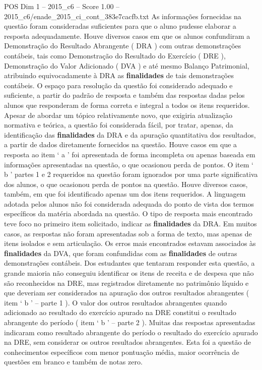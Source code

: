 \begin{textsample}{POS Dim 1 – 2015\_c6 – Score 1.00 – 2015\_c6/enade\_2015\_ci\_cont\_383e7cacfb.txt}
As informações fornecidas na questão foram consideradas suficientes para que o aluno pudesse elaborar a resposta adequadamente.
Houve diversos casos em que os alunos confundiram a Demonstração do Resultado Abrangente ( DRA ) com outras demonstrações contábeis, tais como Demonstração do Resultado do Exercício ( DRE ), Demonstração do Valor Adicionado ( DVA ) e até mesmo Balanço Patrimonial, atribuindo equivocadamente à DRA as \textbf{finalidades} de tais demonstrações contábeis.
O espaço para resolução da questão foi considerado adequado e suficiente, a partir do padrão de resposta e também das respostas dadas pelos alunos que responderam de forma correta e integral a todos os itens requeridos.
Apesar de abordar um tópico relativamente novo, que exigiria atualização normativa e teórica, a questão foi considerada fácil, por tratar, apenas, da identificação das \textbf{finalidades} da DRA e da apuração quantitativa dos resultados, a partir de dados diretamente fornecidos na questão.
Houve casos em que a resposta ao item ‘ a ’ foi apresentada de forma incompleta ou apenas baseada em informações apresentadas na questão, o que ocasionou perda de pontos.
O item ‘ b ’ partes 1 e 2 requeridos na questão foram ignorados por uma parte significativa dos alunos, o que ocasionou perda de pontos na questão.
Houve diversos casos, também, em que foi identificado apenas um dos itens requeridos.
A linguagem adotada pelos alunos não foi considerada adequada do ponto de vista dos termos específicos da matéria abordada na questão.
O tipo de resposta mais encontrado teve foco no primeiro item solicitado, indicar as \textbf{finalidades} da DRA.
Em muitos casos, as respostas não foram apresentadas sob a forma de texto, mas apenas de itens isolados e sem articulação.
Os erros mais encontrados estavam associados às \textbf{finalidades} da DVA, que foram confundidas com as \textbf{finalidades} de outras demonstrações contábeis.
Dos estudantes que tentaram responder esta questão, a grande maioria não conseguiu identificar os itens de receita e de despesa que não são reconhecidos na DRE, mas registrados diretamente no patrimônio líquido e que deveriam ser considerados na apuração dos outros resultados abrangentes ( item ‘ b ’ – parte 1 ).
O valor dos outros resultados abrangentes quando adicionado ao resultado do exercício apurado na DRE constitui o resultado abrangente do período ( item ‘ b ’ – parte 2 ).
Muitas das respostas apresentadas indicaram como resultado abrangente do período o resultado do exercício apurado na DRE, sem considerar os outros resultados abrangentes.
Esta foi a questão de conhecimentos específicos com menor pontuação média, maior ocorrência de questões em branco e também de notas zero.

\end{textsample}
